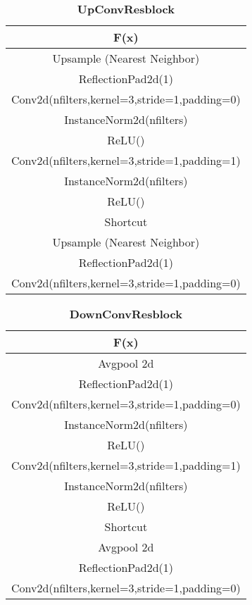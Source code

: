 \begin{table}[ht]
\caption{\textbf{UpConvResblock}} %
\centering %
\begin{tabular}{c} %
\hline\hline %
F(x)\\%
\hline
Upsample (Nearest Neighbor) \\
ReflectionPad2d(1) \\
Conv2d(nfilters,kernel=3,stride=1,padding=0) \\
InstanceNorm2d(nfilters)\\ %
ReLU() \\
Conv2d(nfilters,kernel=3,stride=1,padding=1) \\
InstanceNorm2d(nfilters)\\ %
ReLU() \\
\hline %
Shortcut\\
\hline 
Upsample (Nearest Neighbor) \\
ReflectionPad2d(1)\\
Conv2d(nfilters,kernel=3,stride=1,padding=0) \\
\hline
\end{tabular}
\label{table:upconvresblock} %
\end{table}

\begin{table}[ht]
\caption{\textbf{DownConvResblock}} %
\centering %
\begin{tabular}{c} %
\hline\hline %
F(x)\\%
\hline
Avgpool 2d \\
ReflectionPad2d(1) \\
Conv2d(nfilters,kernel=3,stride=1,padding=0) \\
InstanceNorm2d(nfilters)\\ %
ReLU() \\
Conv2d(nfilters,kernel=3,stride=1,padding=1) \\
InstanceNorm2d(nfilters)\\ %
ReLU() \\
\hline %
Shortcut\\
\hline 
Avgpool 2d \\
ReflectionPad2d(1)\\
Conv2d(nfilters,kernel=3,stride=1,padding=0) \\
\hline
\end{tabular}
\label{table:downconvresblock} %
\end{table}


